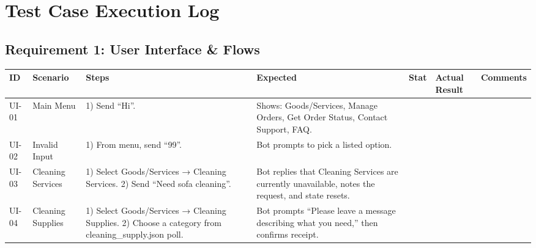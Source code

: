 ﻿\documentclass[11pt, a4paper]{article}
\begin{document}
\newpage
\section{Test Case Execution Log}

\renewcommand{\arraystretch}{1.3}

\subsection{Requirement 1: User Interface \& Flows}
\begin{longtable}{|p{}|p{}|p{}|p{}|p{}|p{}|p{}|}
    \hline
    \rowcolor{headergray} \textbf{ID} & \textbf{Scenario} & \textbf{Steps} & \textbf{Expected} & \textbf{Stat} & \textbf{Actual Result} & \textbf{Comments} \\ \hline
    \endhead

    UI-01 & Main Menu & 1) Send “Hi”. & Shows: Goods/Services, Manage Orders, Get Order Status, Contact Support, FAQ. & & & \\ \hline

    UI-02 & Invalid Input & 1) From menu, send “99”. & Bot prompts to pick a listed option. & & & \\ \hline

    UI-03 & Cleaning Services & 1) Select Goods/Services → Cleaning Services. 2) Send “Need sofa cleaning”. & Bot replies that Cleaning Services are currently unavailable, notes the request, and state resets. & & & \\ \hline

    UI-04 & Cleaning Supplies & 1) Select Goods/Services → Cleaning Supplies. 2) Choose a category from cleaning\_supply.json poll. & Bot prompts “Please leave a message describing what you need,” then confirms receipt. & & & \\ \hline
\end{longtable}
\end{document}
